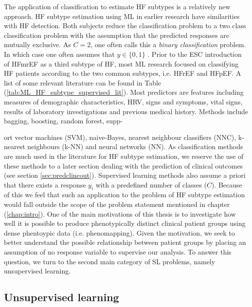 \documentclass[../thesis.tex]{subfiles}
\begin{document}
\indent The application of classification to estimate HF subtypes is a relatively new approach. HF subtype estimation using ML in earlier research have similarities with HF detection. Both subjects reduce the classification problem to a two class classification problem with the assumption that the predicted responses are mutually exclusive. As $C = 2$, one often calls this a \textit{binary classification} problem. In which case one often assumes that $y \in \{0,1\}$ \citep{muphy2012machine}. Prior to the ESC introduction of HFmrEF as a third subtype of HF, most ML research focused on classifying HF patients according to the two common subtypes, i.e. HFrEF and HFpEF. A list of some relevant literature can be found in Table (\ref{tab:ML_HF_subtype_supervised_lit}). Most predictors are features including measures of demographic characteristics, HRV, signs and symptoms, vital signs, results of laboratory investigations and previous medical history. Methods include bagging, boosting, random forest, supp-



\noindent ort vector machines (SVM), naive-Bayes, nearest neighbour classifiers (NNC), k-nearest neighbours (k-NN) and neural networks (NN). As classification methods are much used in the literature for HF subtype estimation, we reserve the use of these methods to a later section dealing with the prediction of clinical outcomes (see section \ref{sec:predclincout}). Supervised learning methods also assume a priori that there exists a response $y_i$ with a predefined number of classes ($C$). Because of this we feel that such an application to the problem of HF subtype estimation would fall outside the scope of the problem statement mentioned in chapter (\ref{chap:intro}). One of the main motivations of this thesis is to investigate how well it is possible to produce phenotypically distinct clinical patient groups using dense phentoypic data (i.e. phenomapping). Given the motivation, we seek to better understand the possible relationship between patient groups by placing an assumption of no response variable to supervise our analysis. To answer this question, we turn to the second main category of SL problems, namely unsupervised learning.


\subsection{Unsupervised learning}
\label{subsec:unsupervisedlearn}
\end{document}
